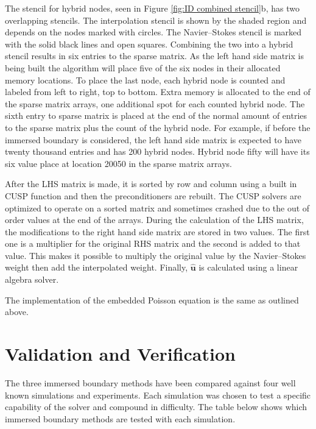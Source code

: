 The stencil for hybrid nodes, seen in Figure \ref{fig:ID combined stencil}b, has two overlapping stencils. 
The interpolation stencil is shown by the shaded region and depends on the nodes marked with circles. 
The Navier--Stokes stencil is marked with the solid black lines and open squares.
Combining the two into a hybrid stencil results in six entries to the sparse matrix.
As the left hand side matrix is being built the algorithm will place five of the six nodes in their allocated memory locations. 
To place the last node, each hybrid node is counted and labeled from left to right, top to bottom. 
Extra memory is allocated to the end of the sparse matrix arrays, one additional spot for each counted hybrid node. 
The sixth entry to sparse matrix is placed at the end of the normal amount of entries to the sparse matrix plus the count of the hybrid node. 
For example, if before the immersed boundary is considered, the left hand side matrix is expected to have twenty thousand entries and has 200 hybrid nodes. 
Hybrid node fifty will have its six value place at location 20050 in the sparse matrix arrays. 

After the LHS matrix is made, it is sorted by row and column using a built in CUSP function and then the preconditioners are rebuilt.
The CUSP solvers are optimized to operate on a sorted matrix and sometimes crashed due to the out of order values at the end of the arrays.
During the calculation of the LHS matrix, the modifications to the right hand side matrix are stored in two values.
The first one is a multiplier for the original RHS matrix and the second is added to that value.
This makes it possible to multiply the original value by the Navier--Stokes weight then add the interpolated weight.
Finally, $\hat{\textbf{u}}$ is calculated using a linear algebra solver.

The implementation of the embedded Poisson equation is the same as outlined above.

\chapter{Validation and Verification}\label{chapter:Validation}
The three immersed boundary methods have been compared against four well known simulations and experiments. 
Each simulation was chosen to test a specific capability of the solver and compound in difficulty.
The table below shows which immersed boundary methods are tested with each simulation.

